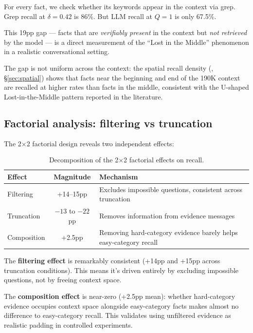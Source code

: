 For every fact, we check whether its keywords appear in the context via grep.
Grep recall at $\delta=0.42$ is 86\%. But LLM recall at $Q=1$ is only 67.5\%.

This 19pp gap --- facts that are \textit{verifiably present} in the context but
\textit{not retrieved} by the model --- is a direct measurement of the ``Lost in the
Middle'' phenomenon \citep{liu2023lostmiddle} in a realistic conversational setting.

The gap is not uniform across the context: the spatial recall density
(, \S\ref{sec:spatial}) shows that facts near the beginning and end of the 190K
context are recalled at higher rates than facts in the middle, consistent
with the U-shaped Lost-in-the-Middle pattern reported in the literature.

\subsection{Factorial analysis: filtering vs truncation}
\label{sec:factorial-analysis}

The 2$\times$2 factorial design reveals two independent effects:

\begin{table}[h]
\centering
\caption{Decomposition of the 2$\times$2 factorial effects on recall.}
\label{tab:factorial}
\begin{tabular}{lcl}
\toprule
Effect      & Magnitude & Mechanism \\
\midrule
Filtering   & +14--15pp  & Excludes impossible questions, consistent across truncation \\
Truncation  & $-13$ to $-22$pp  & Removes information from evidence messages \\
Composition & +2.5pp     & Removing hard-category evidence barely helps easy-category recall \\
\bottomrule
\end{tabular}
\end{table}

The \textbf{filtering effect} is remarkably consistent (+14pp and +15pp across
truncation conditions). This means it's driven entirely by excluding
impossible questions, not by freeing context space.

The \textbf{composition effect} is near-zero (+2.5pp mean): whether hard-category
evidence occupies context space alongside easy-category facts makes almost
no difference to easy-category recall. This validates using unfiltered
evidence as realistic padding in controlled experiments.
